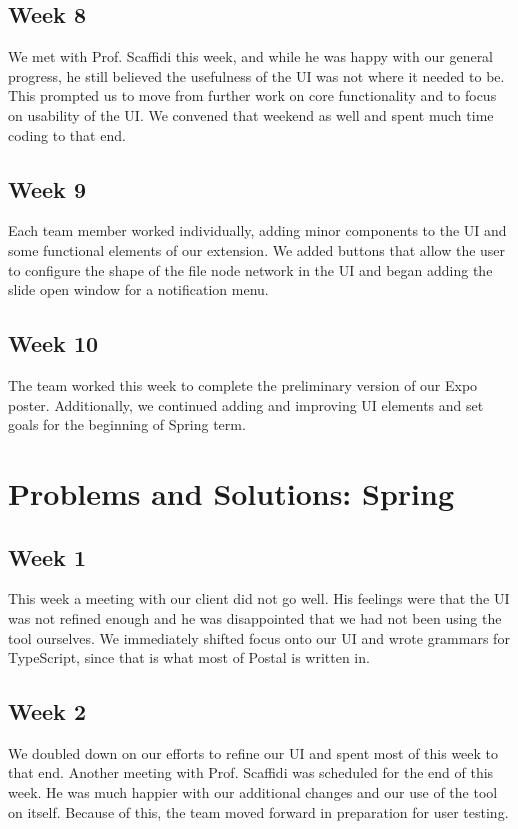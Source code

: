 \documentclass[letterpaper,10pt,titlepage,draftclsnofoot,onecolumn,onesided] {IEEEtran}
\begin{document}
	\subsection{Week 8} 
	We met with Prof. Scaffidi this week, and while he was happy with our general progress, he still believed the usefulness of the UI was not where it needed to be. 
	This prompted us to move from further work on core functionality and to focus on usability of the UI. 
	We convened that weekend as well and spent much time coding to that end.
	
	\subsection{Week 9} 
	Each team member worked individually, adding minor components to the UI and some functional elements of our extension. 
	We added buttons that allow the user to configure the shape of the file node network in the UI and began adding the slide open window for a notification menu.
	
	\subsection{Week 10} 
	The team worked this week to complete the preliminary version of our Expo poster. 
	Additionally, we continued adding and improving UI elements and set goals for the beginning of Spring term.
	
\section{Problems and Solutions: Spring}
	\subsection{Week 1}
	This week a meeting with our client did not go well. 
	His feelings were that the UI was not refined enough and he was disappointed that we had not been using the tool ourselves.
	We immediately shifted focus onto our UI and wrote grammars for TypeScript, since that is what most of Postal is written in.
	
	\subsection{Week 2}
	We doubled down on our efforts to refine our UI and spent most of this week to that end. 
	Another meeting with Prof. Scaffidi was scheduled for the end of this week.
	He was much happier with our additional changes and our use of the tool on itself.
	Because of this, the team moved forward in preparation for user testing.
	
\end{document}
